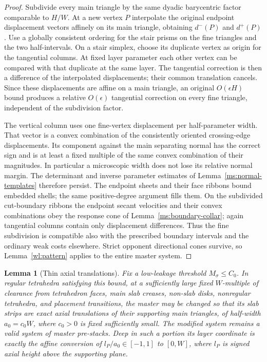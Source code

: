 \documentclass[11pt]{article}
\numberwithin{equation}{section}
\newtheorem{lemma}[theorem]{Lemma}
\theoremstyle{definition}
\theoremstyle{remark}
\begin{document}
\begin{proof}
Subdivide every main triangle by the same dyadic barycentric
factor comparable to $H/W$.  At a new vertex $P$ interpolate the
original endpoint displacement vectors affinely on its main
triangle, obtaining $d^-(P)$ and $d^+(P)$.  Use a globally
consistent ordering for the stair prisms on the fine triangles
and the two half-intervals.  On a stair simplex, choose its
duplicate vertex as origin for the tangential columns.  At fixed
layer parameter each other vertex can be compared with that
duplicate at the same layer.  The tangential correction is then
a difference of the interpolated displacements; their common
translation cancels.  Since these displacements are affine on a
main triangle, an original $O(\epsilon H)$ bound produces a
relative $O(\epsilon)$ tangential correction on every fine
triangle, independent of the subdivision factor.

The vertical column uses one fine-vertex displacement per
half-parameter width.  That vector is a convex combination of
the consistently oriented crossing-edge displacements.  Its
component against the main separating normal has the correct
sign and is at least a fixed multiple of the same convex
combination of their magnitudes.  In particular a microscopic
width does not lose its relative normal margin.  The determinant
and inverse parameter estimates of Lemma~\ref{ms:normal-templates}
therefore persist.  The endpoint sheets and their face ribbons
bound embedded shells; the same positive-degree argument fills
them.  On the subdivided cut-boundary ribbons the endpoint
secant velocities and their convex combinations obey the
response cone of Lemma~\ref{ms:boundary-collar}; again tangential
columns contain only displacement differences.  Thus the fine
subdivision is compatible also with the prescribed boundary
intervals and the ordinary weak costs elsewhere.  Strict
opponent directional cones survive, so Lemma~\ref{wl:pattern} applies
to the entire master system.
\end{proof}

\begin{lemma}[Thin axial translations]
\label{ms:translations}
Fix a low-leakage threshold $M_\sigma\le C_0$.  In regular
tetrahedra satisfying this bound, at a sufficiently large fixed
$W$-multiple of
clearance from tetrahedron faces, main slab creases, non-slab
disks, nonregular tetrahedra, and placement transitions, the master
may be changed so that its slab strips are exact axial
translations of their supporting main triangles, of half-width
$a_0=c_0W$, where $c_0>0$ is fixed sufficiently small.  The
modified system remains a valid system of master pre-stacks.  Deep in such
a portion its layer coordinate is exactly the affine conversion
of $l_P/a_0\in[-1,1]$ to $[0,W]$, where $l_P$ is signed axial
height above the supporting plane.
\end{lemma}
\end{document}
